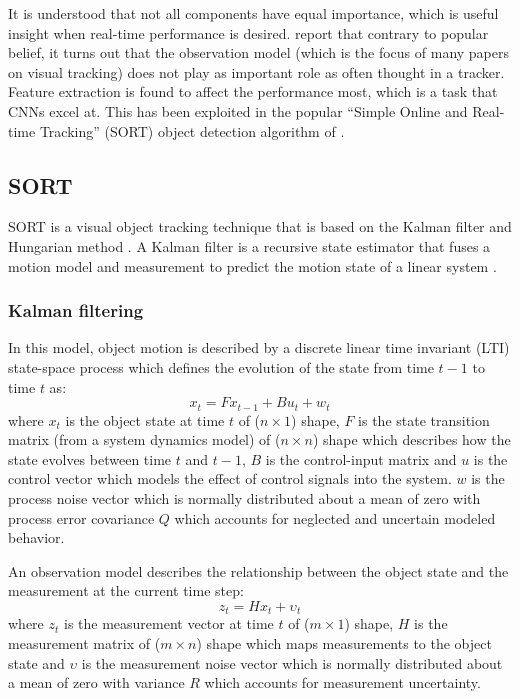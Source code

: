 \documentclass[a4paper,twoside,12pt]{report}
\begin{document}
It is understood that not all components have equal importance, which is useful insight when real-time performance is desired. \cite{diagnosingtrack} report that contrary to popular belief, it turns out that the observation model (which is the focus of many papers on visual tracking) does not play as important role as often thought in a tracker. Feature extraction is found to affect the performance most, which is a task that CNNs excel at. This has been exploited in the popular ``Simple Online and Real-time Tracking'' (SORT) object detection algorithm of \cite{sort}.

\subsection{SORT}

SORT is a visual object tracking technique that is based on the Kalman filter \citep{kalman} and Hungarian method \citep{hungarian}. A Kalman filter is a recursive state estimator that fuses a motion model and measurement to predict the motion state of a linear system \citep{trackbook}. 

\subsubsection{Kalman filtering}

In this model, object motion is described by a discrete linear time invariant (LTI) state-space process which defines the evolution of the state from time $t-1$ to time $t$ as:
\begin{equation} 
x_t=Fx_{t-1}+Bu_{t}+w_{t}
\end{equation}
where $x_{t}$ is the object state at time $t$ of ($n \times 1$) shape, $F$ is the state transition matrix (from a system dynamics model) of ($n \times n$) shape which describes how the state evolves between time $t$ and $t-1$, $B$ is the control-input matrix and $u$ is the control vector which models the effect of control signals into the system. $w$ is the process noise vector which is normally distributed about a mean of zero with process error covariance $Q$ which accounts for neglected and uncertain modeled behavior.

An observation model describes the relationship between the object state and the measurement at the current time step:
\begin{equation} 
z_t=Hx_{t}+{\upsilon}_t
\end{equation}
where $z_{t}$ is the measurement vector at time $t$ of ($m \times 1$) shape, $H$ is the measurement matrix of ($m \times n$) shape which maps measurements to the object state and $\upsilon$ is the measurement noise vector which is normally distributed about a mean of zero with variance $R$ which accounts for measurement uncertainty.
\end{document}
